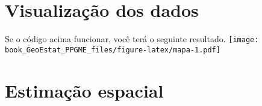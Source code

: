 \documentclass[
]{book}
\newenvironment{Shaded}{\begin{snugshade}}{\end{snugshade}}
\newcommand{\AttributeTok}[1]{\textcolor[rgb]{0.77,0.63,0.00}{#1}}
\newcommand{\DecValTok}[1]{\textcolor[rgb]{0.00,0.00,0.81}{#1}}
\newcommand{\DocumentationTok}[1]{\textcolor[rgb]{0.56,0.35,0.01}{\textbf{\textit{#1}}}}
\newcommand{\FunctionTok}[1]{\textcolor[rgb]{0.00,0.00,0.00}{#1}}
\newcommand{\NormalTok}[1]{#1}
\newcommand{\SpecialCharTok}[1]{\textcolor[rgb]{0.00,0.00,0.00}{#1}}
\newcommand{\StringTok}[1]{\textcolor[rgb]{0.31,0.60,0.02}{#1}}
\theoremstyle{definition}
\theoremstyle{definition}
\theoremstyle{definition}
\theoremstyle{definition}
\theoremstyle{remark}
\begin{document}
\hypertarget{visualizauxe7uxe3o-dos-dados}{%
\section{Visualização dos dados}\label{visualizauxe7uxe3o-dos-dados}}

\begin{Shaded}
\end{Shaded}

Se o código acima funcionar, você terá o seguinte resultado.
\texttt{[image: book\_GeoEstat\_PPGME\_files/figure-latex/mapa-1.pdf]}

\hypertarget{estimauxe7uxe3o-espacial}{%
\section{Estimação espacial}\label{estimauxe7uxe3o-espacial}}
\end{document}
